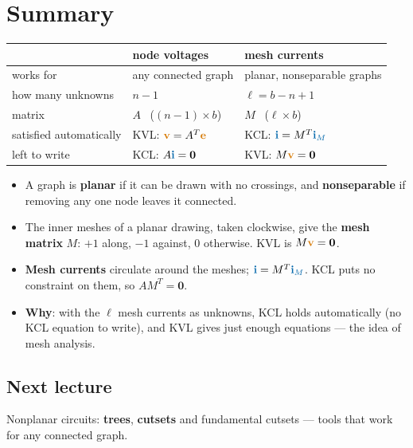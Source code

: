 \documentclass[11pt,a4paper]{article}
\newcommand{\Icol}[1]{\textcolor{ccur}{#1}}
\newcommand{\Vcol}[1]{\textcolor{cvolt}{#1}}
\begin{document}
\section*{Summary}

\begin{center}
\small
\renewcommand{\arraystretch}{1.25}
\begin{tabular}{@{}l l l@{}}
\toprule
 & \textbf{node voltages} & \textbf{mesh currents}\\
\midrule
works for                & any connected graph       & planar, nonseparable graphs\\
how many unknowns        & $n - 1$                   & $\ell = b - n + 1$\\
matrix                   & $A$ \ ($(n-1)\times b$)   & $M$ \ ($\ell\times b$)\\
satisfied automatically  & KVL: $\Vcol{\mathbf{v}} = A^T\Vcol{\mathbf{e}}$
                         & KCL: $\Icol{\mathbf{i}} = M^T\Icol{\mathbf{i}_M}$\\
left to write            & KCL: $A\Icol{\mathbf{i}} = \mathbf{0}$
                         & KVL: $M\Vcol{\mathbf{v}} = \mathbf{0}$\\
\bottomrule
\end{tabular}
\end{center}

\begin{itemize}
  \item A graph is \textbf{planar} if it can be drawn with no crossings, and
        \textbf{nonseparable} if removing any one node leaves it connected.
  \item The inner meshes of a planar drawing, taken clockwise, give the \textbf{mesh matrix}
        $M$: $+1$ along, $-1$ against, $0$ otherwise. KVL is $M\Vcol{\mathbf{v}} = \mathbf{0}$.
  \item \textbf{Mesh currents} circulate around the meshes; $\Icol{\mathbf{i}} =
        M^T\Icol{\mathbf{i}_M}$. KCL puts no constraint on them, so $AM^T = \mathbf{0}$.
  \item \textbf{Why}: with the $\ell$ mesh currents as unknowns, KCL holds automatically (no KCL equation
        to write), and KVL gives
        just enough equations --- the idea of mesh analysis.
\end{itemize}

\subsection*{Next lecture}
Nonplanar circuits: \textbf{trees}, \textbf{cutsets} and fundamental cutsets --- tools that
work for any connected graph.
\end{document}
